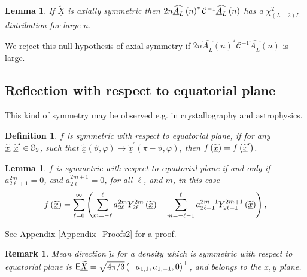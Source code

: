 \documentclass[preprint,11pt,a4paper]{elsarticle}
\newtheorem{definition}[theorem]{Definition}
\newtheorem{lemma}[theorem]{Lemma}
\newtheorem{remark}[theorem]{Remark}
\begin{document}
\begin{lemma}
If $\underline{\widetilde{X}}$ is axially symmetric then $2n\widehat{%
\underline{A}_{L}}\left( n\right) ^{\ast}\mathcal{C}^{-1}\widehat{\underline{%
A}_{L}}\left( n\right) $ has a $\chi_{\left( L+2\right) L}^{2}$ distribution
for large $n$.
\end{lemma}

We reject this null hypothesis of axial symmetry if $2n\widehat{\underline{A}%
_{L}}\left( n\right) ^{\ast}\mathcal{C}^{-1}\widehat{\underline{A}_{L}}%
\left( n\right) $ is large.

\subsection{Reflection with respect to equatorial plane}

This kind of symmetry may be observed e.g. in crystallography and
astrophysics.

\begin{definition}
$f$ is symmetric with respect to equatorial plane, if for any $\underline{%
\widetilde{x}},\underline{\widetilde{x}}^{\prime}\in\mathbb{S}_{2}$, such
that $\underline{\widetilde{x}}\left( \vartheta,\varphi\right) \rightarrow%
\underline{\widetilde{x}}^{\prime}\left( \pi-\vartheta ,\varphi\right) $,
then $f\left( \underline{\widetilde{x}}\right) =f\left( \underline{%
\widetilde{x}}^{\prime}\right) $.
\end{definition}

\begin{lemma}
\label{Lemma_Equa_plane}$f$ is symmetric with respect to equatorial plane if
and only if $a_{2\ell+1}^{2m}=0$, and $a_{2\ell}^{2m+1}=0$, for all $\ell$,
and $m$, in this case%
\begin{equation*}
f\left( \underline{\widetilde{x}}\right) =\sum_{\ell=0}^{\infty}\left(
\sum_{m=-\ell}^{\ell}a_{2\ell}^{2m}Y_{2\ell}^{2m}\left( \underline{%
\widetilde{x}}\right)
+\sum_{m=-\ell-1}^{\ell}a_{2\ell+1}^{2m+1}Y_{2\ell+1}^{2m+1}\left( 
\underline{\widetilde{x}}\right) \right) ,
\end{equation*}
\end{lemma}

See Appendix \ref{Appendix_Proofs2} for a proof.

\begin{remark}
Mean direction $\underline{\widetilde{\mu}}$ for a density which is
symmetric with respect to equatorial plane is $\mathsf{E}\underline{%
\widetilde{X}}=\sqrt{4\pi/3}\left( -a_{1,1},a_{1,-1},0\right) ^{\top}$, and
belongs to the $x,y$ plane.
\end{remark}
\end{document}

